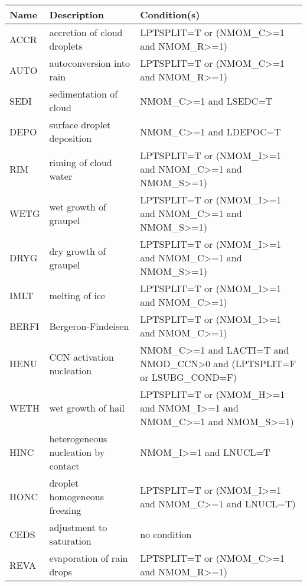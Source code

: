 \begin{longtable} {|p{}|p{}|p{}|}
\hline
Name & Description & Condition(s) \\
\hline \hline
\endhead
ACCR   & accretion of cloud droplets                              & LPTSPLIT=T or (NMOM\_C>=1 and NMOM\_R>=1) \\\hline
AUTO   & autoconversion into rain                                 & LPTSPLIT=T or (NMOM\_C>=1 and NMOM\_R>=1) \\\hline
SEDI   & sedimentation of cloud                                   & NMOM\_C>=1 and LSEDC=T \\\hline
DEPO   & surface droplet deposition                               & NMOM\_C>=1 and LDEPOC=T \\\hline
RIM    & riming of cloud water                                    & LPTSPLIT=T or (NMOM\_I>=1 and NMOM\_C>=1 and NMOM\_S>=1) \\\hline
WETG   & wet growth of graupel                                    & LPTSPLIT=T or (NMOM\_I>=1 and NMOM\_C>=1 and NMOM\_S>=1) \\\hline
DRYG   & dry growth of graupel                                    & LPTSPLIT=T or (NMOM\_I>=1 and NMOM\_C>=1 and NMOM\_S>=1) \\\hline
IMLT   & melting of ice                                           & LPTSPLIT=T or (NMOM\_I>=1 and NMOM\_C>=1) \\\hline
BERFI  & Bergeron-Findeisen                                       & LPTSPLIT=T or (NMOM\_I>=1 and NMOM\_C>=1) \\\hline
HENU   & CCN activation nucleation                                & NMOM\_C>=1 and LACTI=T and NMOD\_CCN>0 and (LPTSPLIT=F or LSUBG\_COND=F) \\\hline
WETH   & wet growth of hail                                       & LPTSPLIT=T or (NMOM\_H>=1 and NMOM\_I>=1 and NMOM\_C>=1 and NMOM\_S>=1) \\\hline
HINC   & heterogeneous nucleation by contact                      & NMOM\_I>=1 and LNUCL=T \\\hline
HONC   & droplet homogeneous freezing                             & LPTSPLIT=T or (NMOM\_I>=1 and NMOM\_C>=1 and LNUCL=T) \\\hline
CEDS   & adjustment to saturation                                 & no condition \\\hline
REVA   & evaporation of rain drops                                & LPTSPLIT=T or (NMOM\_C>=1 and NMOM\_R>=1) \\\hline

\end{longtable}
